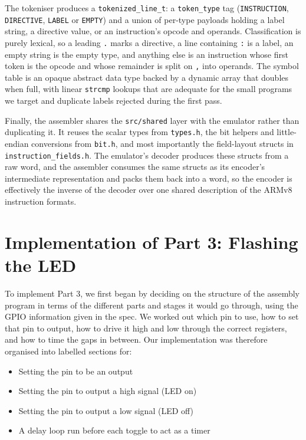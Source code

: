 \documentclass[11pt]{article}
\newcommand{\code}[1]{\texttt{#1}}
\begin{document}
The tokeniser produces a \code{tokenized\_line\_t}: a \code{token\_type} tag (\code{INSTRUCTION}, \code{DIRECTIVE}, \code{LABEL} or \code{EMPTY}) and a union of per-type payloads holding a label string, a directive value, or an instruction's opcode and operands. Classification is purely lexical, so a leading \code{.} marks a directive, a line containing \code{:} is a label, an empty string is the empty type, and anything else is an instruction whose first token is the opcode and whose remainder is split on \code{,} into operands. The symbol table is an opaque abstract data type backed by a dynamic array that doubles when full, with linear \code{strcmp} lookups that are adequate for the small programs we target and duplicate labels rejected during the first pass.

Finally, the assembler shares the \code{src/shared} layer with the emulator rather than duplicating it. It reuses the scalar types from \code{types.h}, the bit helpers and little-endian conversions from \code{bit.h}, and most importantly the field-layout structs in \code{instruction\_fields.h}. The emulator's decoder produces these structs from a raw word, and the assembler consumes the same structs as its encoder's intermediate representation and packs them back into a word, so the encoder is effectively the inverse of the decoder over one shared description of the ARMv8 instruction formats.

\section{Implementation of Part 3: Flashing the LED}

To implement Part 3, we first began by deciding on the structure of the assembly program in terms of the different parts and stages it would go through, using the GPIO information given in the spec. We worked out which pin to use, how to set that pin to output, how to drive it high and low through the correct registers, and how to time the gaps in between. Our implementation was therefore organised into labelled sections for:

\begin{itemize}
\item Setting the pin to be an output
\item Setting the pin to output a high signal (LED on)
\item Setting the pin to output a low signal (LED off)
\item A delay loop run before each toggle to act as a timer
\end{itemize}
\end{document}
